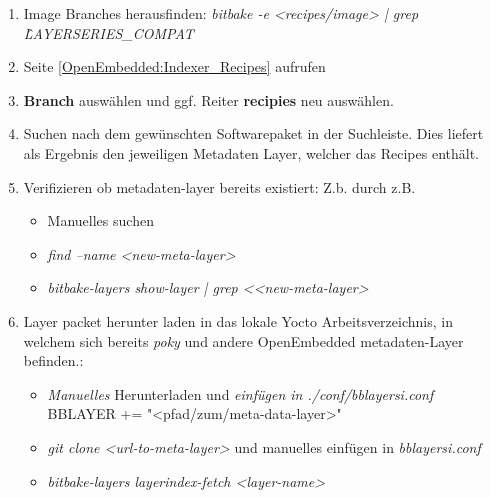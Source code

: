 \begin{enumerate}
    \item Image Branches herausfinden:
        \textit{bitbake -e <recipes/image> | grep \^LAYERSERIES\_COMPAT}

    \item Seite \ref{OpenEmbedded:Indexer_Recipes} aufrufen

    \item \textbf{Branch} auswählen und ggf. Reiter \textbf{recipies} neu
        auswählen.

    \item Suchen nach dem gewünschten Software\-paket in der Suchleiste. Dies
        liefert als Ergebnis den jeweiligen Metadaten Layer, welcher das Recipes
        enthält.

    \item Verifizieren ob metadaten-layer bereits existiert: Z.b. durch z.B.
        \begin{itemize}
            \item Manuelles suchen
            \item \textit{find --name <new-meta-layer>}
            \item \textit{bitbake-layers show-layer | grep <<new-meta-layer>}
        \end{itemize}

    \item Layer packet herunter laden in das lokale Yocto Arbeitsverzeichnis, in
        welchem sich bereits \textit{poky} und andere OpenEmbedded
        metadaten-Layer befinden.:
        \begin{itemize}
            \item \textit{Manuelles} Herunterladen und
                \textit{einfügen in ./conf/bblayersi.conf}
                BBLAYER += "<pfad/zum/meta-data-layer>"
            \item \textit{git clone <url-to-meta-layer>} und manuelles einfügen
                                        in \textit{bblayersi.conf}
            \item \textit{bitbake-layers layerindex-fetch <layer-name>}
        \end{itemize}


\end{enumerate}
